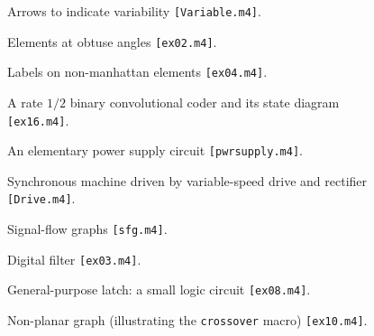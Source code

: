 \documentclass[11pt]{article}
\newcommand{\src}[1]{{\tt [#1]}}
\newcommand{\makepic}{\box\graph} %
\begin{document}
  \begin{figure}[h!t]
    \centerline{ \makepic}
    \caption{Arrows to indicate variability
    \src{Variable.m4}.}
  \end{figure}

  \begin{figure}[h!t]
    \centerline{ \makepic}
    \caption{Elements at obtuse angles
    \src{ex02.m4}.}
  \end{figure}
\clearpage

  \begin{figure}[h!t]
    \centerline{ \makepic}
    \caption{Labels on non-manhattan elements
    \src{ex04.m4}.}
  \end{figure}

  \begin{figure}[h!t]
    \centerline{ \makepic}
    \caption{A rate $1/2$ binary convolutional coder and its state diagram
    \src{ex16.m4}.}
  \end{figure}

  \begin{figure}[h!t]
    \centerline{ \makepic}
    \caption{An elementary power supply circuit
    \src{pwrsupply.m4}.}
  \end{figure}

  \begin{figure}[h!t]
    \centerline{ \makepic}
    \caption{Synchronous machine driven by variable-speed drive and rectifier
    \src{Drive.m4}.}
  \end{figure}
\clearpage

  \begin{figure}[h!t]
    \centerline{ \makepic}
    \caption{Signal-flow graphs
    \src{sfg.m4}.}
  \end{figure}

  \begin{figure}[h!t]
    \centerline{ \makepic}
    \caption{Digital filter
    \src{ex03.m4}.}
  \end{figure}

  \begin{figure}[h!t]
    \centerline{ \makepic}
    \caption{General-purpose latch: a small logic circuit
    \src{ex08.m4}.}
  \end{figure}

  \begin{figure}[h!t]
    \centerline{ \makepic}
    \caption{Non-planar graph (illustrating the {\tt crossover} macro)
    \src{ex10.m4}.}
  \end{figure}
\end{document}

